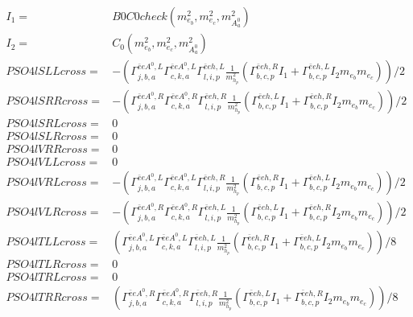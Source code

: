 \documentclass[A4,landscape]{article}
\begin{document}
\begin{align} 
I_1= & B0C0check(m^2_{e_{{b}}}, m^2_{e_{{c}}}, m^2_{A^0_{{a}}}) \\ 
I_2= & C_0(m^2_{e_{{b}}}, m^2_{e_{{c}}}, m^2_{A^0_{{a}}}) \\ 
  PSO4lSLLcross= & -( \Gamma^{\bar{e}e A^0 ,L}_{j, b, a} \Gamma^{\bar{e}e A^0 ,L}_{c, k, a} \Gamma^{\bar{e}e h ,L}_{l, i, p} \frac{1}{m^2_{h_{{p}}}} (\Gamma^{\bar{e}e h ,R}_{b, c, p} I_1 + \Gamma^{\bar{e}e h ,L}_{b, c, p} I_2 m_{e_{{b}}} m_{e_{{c}}}))/2 \\ 
  PSO4lSRRcross= & -( \Gamma^{\bar{e}e A^0 ,R}_{j, b, a} \Gamma^{\bar{e}e A^0 ,R}_{c, k, a} \Gamma^{\bar{e}e h ,R}_{l, i, p} \frac{1}{m^2_{h_{{p}}}} (\Gamma^{\bar{e}e h ,L}_{b, c, p} I_1 + \Gamma^{\bar{e}e h ,R}_{b, c, p} I_2 m_{e_{{b}}} m_{e_{{c}}}))/2 \\ 
  PSO4lSRLcross= & 0 \\ 
  PSO4lSLRcross= & 0 \\ 
  PSO4lVRRcross= & 0 \\ 
  PSO4lVLLcross= & 0 \\ 
  PSO4lVRLcross= & -( \Gamma^{\bar{e}e A^0 ,L}_{j, b, a} \Gamma^{\bar{e}e A^0 ,L}_{c, k, a} \Gamma^{\bar{e}e h ,R}_{l, i, p} \frac{1}{m^2_{h_{{p}}}} (\Gamma^{\bar{e}e h ,R}_{b, c, p} I_1 + \Gamma^{\bar{e}e h ,L}_{b, c, p} I_2 m_{e_{{b}}} m_{e_{{c}}}))/2 \\ 
  PSO4lVLRcross= & -( \Gamma^{\bar{e}e A^0 ,R}_{j, b, a} \Gamma^{\bar{e}e A^0 ,R}_{c, k, a} \Gamma^{\bar{e}e h ,L}_{l, i, p} \frac{1}{m^2_{h_{{p}}}} (\Gamma^{\bar{e}e h ,L}_{b, c, p} I_1 + \Gamma^{\bar{e}e h ,R}_{b, c, p} I_2 m_{e_{{b}}} m_{e_{{c}}}))/2 \\ 
  PSO4lTLLcross= & ( \Gamma^{\bar{e}e A^0 ,L}_{j, b, a} \Gamma^{\bar{e}e A^0 ,L}_{c, k, a} \Gamma^{\bar{e}e h ,L}_{l, i, p} \frac{1}{m^2_{h_{{p}}}} (\Gamma^{\bar{e}e h ,R}_{b, c, p} I_1 + \Gamma^{\bar{e}e h ,L}_{b, c, p} I_2 m_{e_{{b}}} m_{e_{{c}}}))/8 \\ 
  PSO4lTLRcross= & 0 \\ 
  PSO4lTRLcross= & 0 \\ 
  PSO4lTRRcross= & ( \Gamma^{\bar{e}e A^0 ,R}_{j, b, a} \Gamma^{\bar{e}e A^0 ,R}_{c, k, a} \Gamma^{\bar{e}e h ,R}_{l, i, p} \frac{1}{m^2_{h_{{p}}}} (\Gamma^{\bar{e}e h ,L}_{b, c, p} I_1 + \Gamma^{\bar{e}e h ,R}_{b, c, p} I_2 m_{e_{{b}}} m_{e_{{c}}}))/8 \\ 
\end{align} 
\end{document}
